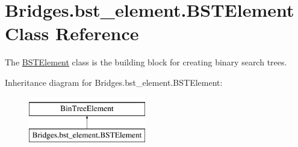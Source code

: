 \hypertarget{class_bridges_1_1bst__element_1_1_b_s_t_element}{}\section{Bridges.\+bst\+\_\+element.\+B\+S\+T\+Element Class Reference}
\label{class_bridges_1_1bst__element_1_1_b_s_t_element}


The \mbox{\hyperlink{class_bridges_1_1bst__element_1_1_b_s_t_element}{B\+S\+T\+Element}} class is the building block for creating binary search trees.  


Inheritance diagram for Bridges.\+bst\+\_\+element.\+B\+S\+T\+Element\+:\begin{figure}[H]
\begin{center}
\leavevmode
\includegraphics[height=2.000000cm]{class_bridges_1_1bst__element_1_1_b_s_t_element}
\end{center}
\end{figure}
